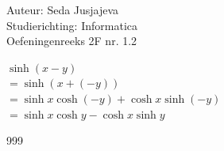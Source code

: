 \documentclass[a4paper]{article}
\begin{document}
\noindent \large Auteur: Seda Jusjajeva\\
\noindent \large Studierichting: Informatica\\
\noindent \large Oefeningenreeks 2F nr. 1.2 \\

\medskip

\normalsize

$\sinh(x - y)$ \\

$= \sinh(x + (-y))$ \\

$= \sinh x\cosh(-y) + \cosh x\sinh(-y)$ \\

$= \sinh x\cosh y - \cosh x\sinh y$ \\



\begin{thebibliography}{999}
\end{thebibliography}
\end{document}
